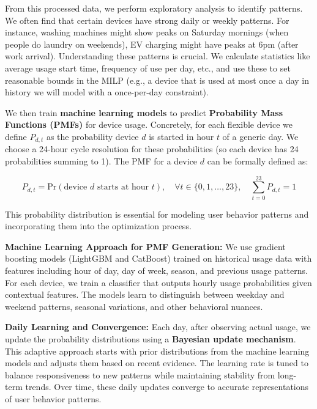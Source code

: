 \documentclass[12pt,a4paper]{article}
\begin{document}
From this processed data, we perform exploratory analysis to identify patterns. We often find that certain devices have strong daily or weekly patterns. For instance, washing machines might show peaks on Saturday mornings (when people do laundry on weekends), EV charging might have peaks at 6pm (after work arrival). Understanding these patterns is crucial. We calculate statistics like average usage start time, frequency of use per day, etc., and use these to set reasonable bounds in the MILP (e.g., a device that is used at most once a day in history we will model with a once-per-day constraint).

We then train \textbf{machine learning models} to predict \textbf{Probability Mass Functions (PMFs)} for device usage. Concretely, for each flexible device we define $P_{d,t}$ as the probability device $d$ is started in hour $t$ of a generic day. We choose a 24-hour cycle resolution for these probabilities (so each device has 24 probabilities summing to 1). The PMF for a device $d$ can be formally defined as:

\begin{equation}
\label{eq:pmf}
P_{d,t} = \text{Pr}(\text{device } d \text{ starts at hour } t), \quad \forall t \in \{0,1,\ldots,23\}, \quad \sum_{t=0}^{23} P_{d,t} = 1
\end{equation}

This probability distribution is essential for modeling user behavior patterns and incorporating them into the optimization process. 

\textbf{Machine Learning Approach for PMF Generation:} We use gradient boosting models (LightGBM and CatBoost) trained on historical usage data with features including hour of day, day of week, season, and previous usage patterns. For each device, we train a classifier that outputs hourly usage probabilities given contextual features. The models learn to distinguish between weekday and weekend patterns, seasonal variations, and other behavioral nuances.

\textbf{Daily Learning and Convergence:} Each day, after observing actual usage, we update the probability distributions using a \textbf{Bayesian update mechanism}. This adaptive approach starts with prior distributions from the machine learning models and adjusts them based on recent evidence. The learning rate is tuned to balance responsiveness to new patterns while maintaining stability from long-term trends. Over time, these daily updates converge to accurate representations of user behavior patterns.
\end{document}

